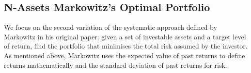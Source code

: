 
\subsection{N-Assets Markowitz's Optimal Portfolio}\label{section:NAssets}
    We focus on the second variation of the systematic approach defined by Markowitz in his original paper: given a set of investable assets and a target level of return, find the portfolio that minimises the total risk assumed by the investor. As mentioned above, Markowitz uses the expected value of past returns to define returns mathematically and the standard deviation of past returns for risk.
    
